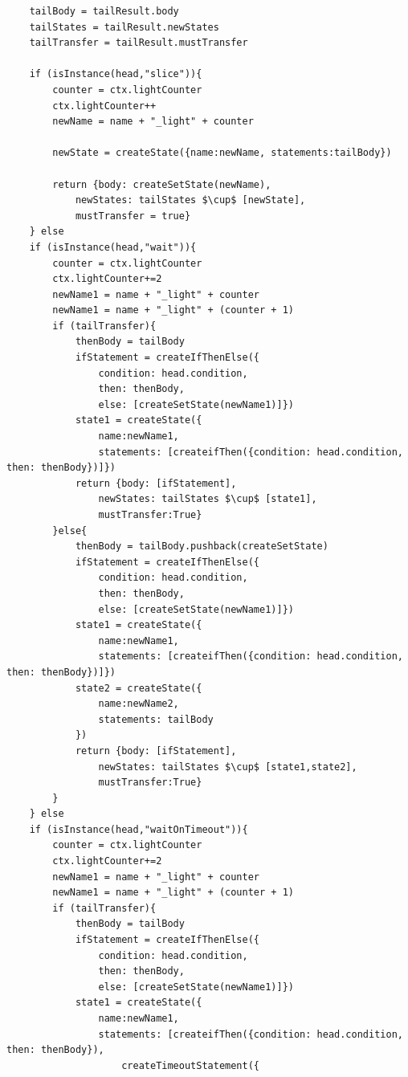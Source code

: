 \begin{lstlisting}
    tailBody = tailResult.body
    tailStates = tailResult.newStates
    tailTransfer = tailResult.mustTransfer

    if (isInstance(head,"slice")){
        counter = ctx.lightСounter
        ctx.lightСounter++
        newName = name + "_light" + counter

        newState = createState({name:newName, statements:tailBody})

        return {body: createSetState(newName), 
            newStates: tailStates $\cup$ [newState],
            mustTransfer = true}
    } else
    if (isInstance(head,"wait")){
        counter = ctx.lightСounter
        ctx.lightСounter+=2
        newName1 = name + "_light" + counter
        newName1 = name + "_light" + (counter + 1)
        if (tailTransfer){
            thenBody = tailBody
            ifStatement = createIfThenElse({
                condition: head.condition, 
                then: thenBody, 
                else: [createSetState(newName1)]})
            state1 = createState({
                name:newName1, 
                statements: [createifThen({condition: head.condition, then: thenBody})]})
            return {body: [ifStatement],
                newStates: tailStates $\cup$ [state1],
                mustTransfer:True}
        }else{
            thenBody = tailBody.pushback(createSetState)
            ifStatement = createIfThenElse({
                condition: head.condition, 
                then: thenBody, 
                else: [createSetState(newName1)]})
            state1 = createState({
                name:newName1, 
                statements: [createifThen({condition: head.condition, then: thenBody})]})
            state2 = createState({
                name:newName2,
                statements: tailBody
            })
            return {body: [ifStatement],
                newStates: tailStates $\cup$ [state1,state2],
                mustTransfer:True} 
        }
    } else 
    if (isInstance(head,"waitOnTimeout")){
        counter = ctx.lightСounter
        ctx.lightСounter+=2
        newName1 = name + "_light" + counter
        newName1 = name + "_light" + (counter + 1)
        if (tailTransfer){
            thenBody = tailBody
            ifStatement = createIfThenElse({
                condition: head.condition, 
                then: thenBody, 
                else: [createSetState(newName1)]})
            state1 = createState({
                name:newName1, 
                statements: [createifThen({condition: head.condition, then: thenBody}),
                    createTimeoutStatement({

\end{lstlisting}
